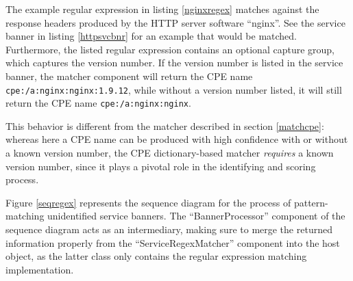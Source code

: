 \documentclass[a4paper,12pt]{article}
\begin{document}
	The example regular expression in listing \ref{nginxregex} matches against the response headers produced by the HTTP server software ``nginx''. See the service banner in listing \ref{httpsvcbnr} for an example that would be matched. Furthermore, the listed regular expression contains an optional capture group, which captures the version number. If the version number is listed in the service banner, the matcher component will return the CPE name \texttt{cpe:/a:nginx:nginx:1.9.12}, while without a version number listed, it will still return the CPE name \texttt{cpe:/a:nginx:nginx}.
	
	This behavior is different from the matcher described in section \ref{matchcpe}: whereas here a CPE name can be produced with high confidence with or without a known version number, the CPE dictionary-based matcher \textit{requires} a known version number, since it plays a pivotal role in the identifying and scoring process.
	
	Figure \ref{seqregex} represents the sequence diagram for the process of pattern-matching unidentified service banners. The ``BannerProcessor'' component of the sequence diagram acts as an intermediary, making sure to merge the returned information properly from the ``ServiceRegexMatcher'' component into the host object, as the latter class only contains the regular expression matching implementation.
		
\end{document}
